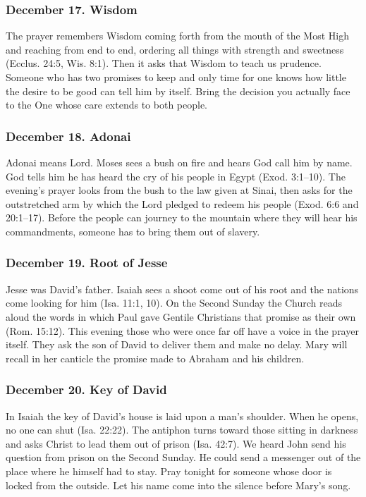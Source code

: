 \subsubsection*{December 17. Wisdom}

The prayer remembers Wisdom coming forth from the mouth of the Most
High and reaching from end to end, ordering all things with strength
and sweetness (Ecclus. 24:5, Wis. 8:1). Then it asks that Wisdom to
teach us prudence. Someone who has two promises to keep and only
time for one knows how little the desire to be good can tell him by
itself. Bring the decision you actually face to the One whose care
extends to both people.

\subsubsection*{December 18. Adonai}

Adonai means Lord. Moses sees a bush on fire and hears God call
him by name. God tells him he has heard the cry of his people in
Egypt (Exod. 3:1--10). The evening's prayer looks from the bush to
the law given at Sinai, then asks for the outstretched arm by which
the Lord pledged to redeem his people (Exod. 6:6 and 20:1--17). Before
the people can journey to the mountain where they will hear his
commandments, someone has to bring them out of slavery.

\subsubsection*{December 19. Root of Jesse}

Jesse was David's father. Isaiah sees a shoot come out of his
root and the nations come looking for him (Isa. 11:1, 10). On
the Second Sunday the Church reads aloud the words in which Paul
gave Gentile Christians that promise as their own (Rom. 15:12).
This evening those who were
once far off have a voice in the prayer itself. They ask the son of
David to deliver them and make no delay. Mary will recall in her
canticle the promise made to Abraham and his children.

\subsubsection*{December 20. Key of David}

In Isaiah the key of David's house is laid upon a man's shoulder.
When he opens, no one can shut (Isa. 22:22). The antiphon turns
toward those sitting in darkness and asks Christ to lead them out
of prison (Isa. 42:7). We heard John send his question from prison
on the Second Sunday. He could send a messenger out of the place
where he himself had to stay. Pray tonight for someone whose door
is locked from the outside. Let his name come into the silence
before Mary's song.

